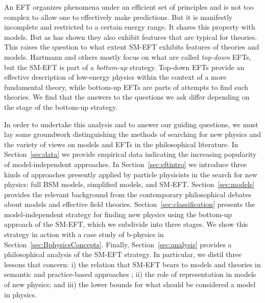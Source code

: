An EFT organizes phenomena under an efficient set of principles and is not too complex to allow one to effectively make predictions. 
But it is manifestly incomplete and restricted to a certain energy range. 
It shares this property with models. 
But as \citet{hartmann2001} has shown they also exhibit features that are typical for theories. 
This raises the question to what extent SM-EFT exhibits features of theories and models.
Hartmann and others mostly focus on what are called \textit{top-down} EFTs, but the SM-EFT is part of a \textit{bottom-up} strategy.
Top-down EFTs provide an effective description of low-energy physics within the context of a more fundamental theory, while bottom-up EFTs are parts of attempts to find such theories. 
We find that the answers to the questions we ask differ depending on the stage of the bottom-up strategy.

In order to undertake this analysis and to answer our guiding questions, we must lay some groundwork distinguishing the methods of searching for new physics and the variety of views on models and EFTs in the philosophical literature. 
In Section~\ref{sec:data} we provide empirical data indicating the increasing popularity of model-independent approaches. 
In Section~\ref{sec:eftintro} we introduce three kinds of approaches presently applied by particle physicists in the search for new physics: full BSM models, simplified models, and SM-EFT. 
Section~\ref{sec:models} provides the relevant background from the contemporary philosophical debates about models and effective field theories. 
Section~\ref{sec:classification} presents the model-independent strategy for finding new physics using the bottom-up approach of the SM-EFT, which we subdivide into three stages.
We show this strategy in action with a case study of b-physics in Section~\ref{sec:BphysicsConcepts}. 
Finally, Section~\ref{sec:analysis} provides a philosophical analysis of the SM-EFT strategy.  
In particular, we distil three lessons that concern: i) the relation that SM-EFT bears to models and theories in semantic \citep{hartmann1998} and practice-based approaches \citep{morganmorrison}; ii) the role of representation in models of new physics; and iii) the lower bounds for what should be considered a model in physics.
